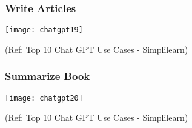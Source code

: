 \begin{frame}[fragile]\frametitle{Write Articles}
\begin{center}
\texttt{[image: chatgpt19]}
\end{center}

{\tiny (Ref: Top 10 Chat GPT Use Cases - Simplilearn)}
\end{frame}

\begin{frame}[fragile]\frametitle{Summarize Book}
\begin{center}
\texttt{[image: chatgpt20]}
\end{center}

{\tiny (Ref: Top 10 Chat GPT Use Cases - Simplilearn)}
\end{frame}







